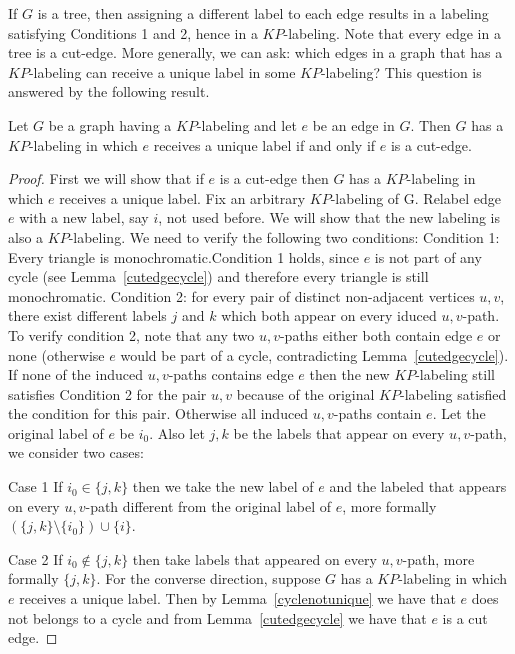 \documentclass[12pt,a4paper,titlepage,openany]{report}
\begin{document}
If $G$ is a tree, then assigning a different label to each edge results in a labeling satisfying Conditions 1 and 2, hence in a $KP$-labeling. Note that every edge in a tree is a cut-edge. More generally, we can ask: which edges in a graph that has a $KP$-labeling can receive a unique label in some $KP$-labeling? This question is answered by the following result. 
\begin{proposition}
Let $G$ be a graph having a $KP$-labeling and let $e$ be an edge in $G$. Then $G$ has a $KP$-labeling in which $e$ receives a unique label if and only if $e$ is a cut-edge.
\end{proposition}

\begin{proof}
First we will show that if $e$ is a cut-edge then $G$ has a $KP$-labeling in which $e$ receives a unique label. Fix an arbitrary $KP$-labeling of G.\newline
Relabel edge $e$ with a new label, say $i$, not used before. We will show that the new labeling is also a $KP$-labeling. We need to verify the following two conditions:\newline
Condition 1: Every triangle is monochromatic.\newline Condition 1 holds, since $e$ is not part of any cycle (see Lemma~\ref{cutedgecycle}) and therefore every triangle is still monochromatic.\newline
Condition 2: for every pair of distinct non-adjacent vertices $u,v$, there exist different labels $j$ and $k$ which both appear on every iduced $u,v$-path.\newline
To verify condition 2, note that any two $u,v$-paths either both contain edge $e$ or none (otherwise $e$ would be part of a cycle, contradicting Lemma~\ref{cutedgecycle}).\newline
If none of the induced $u,v$-paths contains edge $e$ then the new $KP$-labeling still satisfies Condition 2 for the pair $u,v$ because of the original $KP$-labeling satisfied the condition for this pair.\newline
Otherwise all induced $u,v$-paths contain $e$. Let the original label of $e$ be $i_0$. Also let $j,k$ be the labels that appear on every $u,v$-path, we consider two cases:
\item[Case 1] If $i_0\in \{j,k\}$ then we take the new label of $e$ and the labeled that appears on every $u,v$-path different from the original label of $e$, more formally $(\{j,k\}\setminus \{i_0\})\cup \{i\}$.
\item[Case 2] If $i_0\not\in \{j,k\}$ then take labels that appeared on every $u,v$-path, more formally $\{j,k\}$.\newline
For the converse direction, suppose $G$ has a $KP$-labeling in which $e$ receives a unique label. Then by Lemma~\ref{cyclenotunique} we have that $e$ does not belongs to a cycle and from Lemma~\ref{cutedgecycle} we have that $e$ is a cut edge.
\end{proof}
\end{document}
